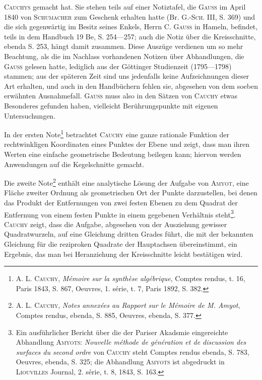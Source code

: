\noindent \textsc{Cauchys} gemacht hat. Sie stehen teils auf einer Notiztafel, die \textsc{Gauss} im
April 1840 von \textsc{Schumacher} zum Geschenk erhalten hatte (Br. G.-\textsc{Sch.} III,
S. 369) und die sich gegenwärtig im Besitz seines Enkels, Herrn C. \textsc{Gauss} in
Hameln, befindet, teils in dem Handbuch 19 Be, S. 254—257; auch die Notiz
über die Kreisschnitte, ebenda S. 253, hängt damit zusammen. Diese Auszüge
verdienen um so mehr Beachtung, als die im Nachlass vorhandenen Notizen
über Abhandlungen, die \textsc{Gauss} gelesen hatte, lediglich aus der Göttinger
Studienzeit (1795—1798) stammen; aus der späteren Zeit sind uns jedenfalls
keine Aufzeichnungen dieser Art erhalten, und auch in den Handbüchern
fehlen sie, abgesehen von dem soeben erwähnten Ausnahmefall. \textsc{Gauss} muss
also in den Sätzen von \textsc{Cauchy} etwas Besonderes gefunden haben, vielleicht
Berührungspunkte mit eigenen Untersuchungen.
\par
In der ersten Note\footnote{A. L. \textsc{Cauchy}, \textit{Mémoire sur la synthèse algébrique}, Comptes rendus, t. 16, Paris 1843, S. 867, Oeuvres, 1. série, t. 7, Paris 1892, S. 382.} betrachtet \textsc{Cauchy} eine ganze rationale Funktion
der rechtwinkligen Koordinaten eines Punktes der Ebene und zeigt, dass man
ihren Werten eine einfache geometrische Bedeutung beilegen kann; hiervon
werden Anwendungen auf die Kegelschnitte gemacht.
\par
Die zweite Note\footnote{A. L. \textsc{Cauchy}, \textit{Notes annexées au Rapport sur le Mémoire de M. Amyot}, Comptes rendus, ebenda, S. 885, Oeuvres, ebenda, S. 377.} enthält eine analytische Lösung der Aufgabe von \textsc{Amyot},
eine Fläche zweiter Ordnung als geometrischen Ort der Punkte darzustellen,
bei denen das Produkt der Entfernungen von zwei festen Ebenen zu dem
Quadrat der Entfernung von einem festen Punkte in einem gegebenen Verhältnis
steht\footnote{Ein ausführlicher Bericht über die der Pariser Akadsmie eingereichte Abhandlung \textsc{Amyots}: \textit{Nouvelle méthode de génération et de discussion des surfaces du second ordre} von \textsc{Cauchy} steht Comptes rendus ebenda, S. 783, Oeuvres, ebenda, S. 325; die Abhandlung \textsc{Amyots} ist abgedruckt in \textsc{Liouvilles} Journal, 2. série, t. 8, 1843, S. 163.}. \textsc{Cauchy} zeigt, dass die Aufgabe, abgesehen von der Ausziehung
gewisser Quadratwurzeln, auf eine Gleichung dritten Grades führt,
die mit der bekannten Gleichung für die reziproken Quadrate der Hauptachsen
übereinstimmt, ein Ergebnis, das man bei Heranziehung der Kreisschnitte
leicht bestätigen wird.
